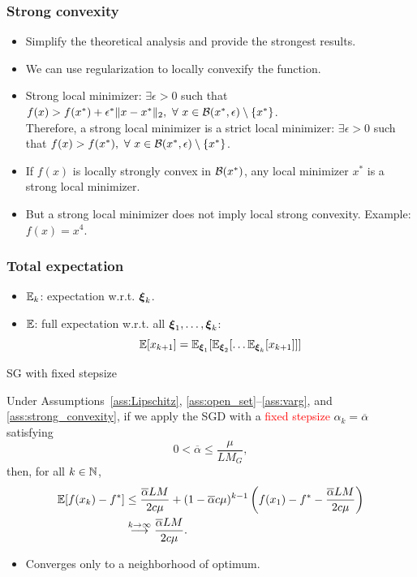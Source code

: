 \documentclass[usepdftitle=false, aspectratio=169]{beamer}
\begin{document}
\begin{frame}
\frametitle{Strong convexity}

\begin{itemize}
	\item Simplify the theoretical analysis and provide the strongest results.
	\item We can use regularization to locally convexify the function.
	\item Strong local minimizer:
        $\exists \epsilon > 0$ such that $f(x) > f(x^*) + \epsilon^*\| x-x^* \|_2,\ \forall\ x \in {\mathcal{B}}(x^*,\epsilon)\setminus\{x^*\}$.\\
       Therefore, a strong local minimizer is a strict local minimizer: $\exists \epsilon > 0$ such that $f(x) > f(x^*),\ \forall\ x \in {\mathcal{B}}(x^*,\epsilon)\setminus\{x^*\}$.
	\item If $f(x)$ is locally strongly convex in ${\mathcal{B}}(x^*)$, any local minimizer $x^*$ is a strong local minimizer.
	\item But a strong local minimizer does not imply local strong convexity. Example: $f(x) = x^4$.
\end{itemize}

\end{frame}

\begin{frame}
	\frametitle{Total expectation}

\begin{itemize}
\item \( {\mathbb{E}}_k \): expectation w.r.t. \( {\boldsymbol{\xi}}_k \).
\item \( {\mathbb{E}} \): full expectation w.r.t. all \( {\boldsymbol{\xi}}_1,\ldots,{\boldsymbol{\xi}}_k \):
$$
{\mathbb{E}} [ x_{k+1} ] =
{\mathbb{E}}_{{\boldsymbol{\xi}}_1}[{\mathbb{E}}_{{\boldsymbol{\xi}}_2}[\ldots{\mathbb{E}}_{{\boldsymbol{\xi}}_k}[x_{k+1}]]]
$$
\end{itemize}
	
\end{frame}

\begin{frame}{SG with fixed stepsize}

\begin{theorem}
Under Assumptions~\ref{ass:Lipschitz}, \ref{ass:open_set}--\ref{ass:varg}, and \ref{ass:strong_convexity}, if we apply the SGD with a \textcolor{red}{fixed stepsize} $\alpha_k = \overline{\alpha}$ satisfying
\begin{equation}
0 < \overline{\alpha} \leq \frac{\mu}{LM_G},
\label{eq:fixed_stepsize}
\end{equation}
then, for all $k \in {\mathbb{N}}$,
\begin{align*}
{\mathbb{E}}[ f(x_k) - f^* ] & \leq \frac{\overline{\alpha}LM}{2c\mu} + (1-\overline{\alpha}c\mu)^{k-1} \left( f(x_1) - f^* - \frac{\overline{\alpha}LM}{2c\mu} \right) \\
& \overset{k \rightarrow \infty}{\longrightarrow} \frac{\overline{\alpha}LM}{2c\mu}.
\end{align*}
\end{theorem}

\begin{itemize}
	\item Converges only to a neighborhood of optimum.
\end{itemize}

\end{frame}
\end{document}
